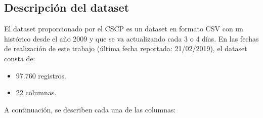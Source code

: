 \subsection{Descripción del dataset}

El dataset proporcionado por el CSCP es un dataset en formato CSV con un histórico desde el año 2009 y que se va actualizando cada 3 o 4 días. En las fechas de realización de este trabajo (última fecha reportada: 21/02/2019), el dataset consta de:

\begin{itemize}
 \item 97.760 registros.
 \item 22 columnas.
\end{itemize}

A continuación, se describen cada una de las columnas:

